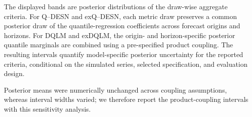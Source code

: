 The displayed bands are posterior distributions of the draw-wise aggregate criteria. For Q--DESN and exQ--DESN, each metric draw preserves a common posterior draw of the quantile-regression coefficients across forecast origins and horizons. For DQLM and exDQLM, the origin- and horizon-specific posterior quantile marginals are combined using a pre-specified product coupling. The resulting intervals quantify model-specific posterior uncertainty for the reported criteria, conditional on the simulated series, selected specification, and evaluation design.

Posterior means were numerically unchanged across coupling assumptions, whereas interval widths varied; we therefore report the product-coupling intervals with this sensitivity analysis.
